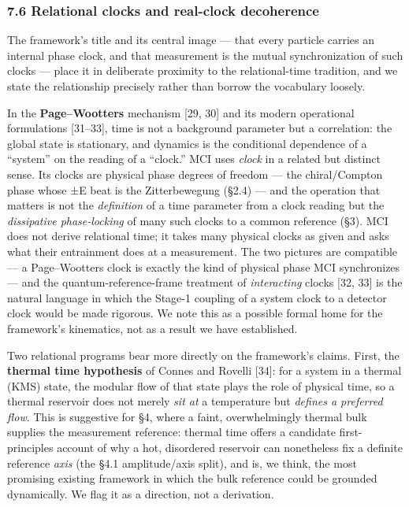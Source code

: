 \documentclass[
]{article}
\newcounter{none} %
\begin{document}
\subsubsection{7.6 Relational clocks and real-clock
decoherence}\label{relational-clocks-and-real-clock-decoherence}

The framework's title and its central image --- that every particle
carries an internal phase clock, and that measurement is the mutual
synchronization of such clocks --- place it in deliberate proximity to
the relational-time tradition, and we state the relationship precisely
rather than borrow the vocabulary loosely.

In the \textbf{Page--Wootters} mechanism {[}29, 30{]} and its modern
operational formulations {[}31--33{]}, time is not a background
parameter but a correlation: the global state is stationary, and
dynamics is the conditional dependence of a ``system'' on the reading of
a ``clock.'' MCI uses \emph{clock} in a related but distinct sense. Its
clocks are physical phase degrees of freedom --- the chiral/Compton
phase whose ±E beat is the Zitterbewegung (§2.4) --- and the operation
that matters is not the \emph{definition} of a time parameter from a
clock reading but the \emph{dissipative phase-locking} of many such
clocks to a common reference (§3). MCI does not derive relational time;
it takes many physical clocks as given and asks what their entrainment
does at a measurement. The two pictures are compatible --- a
Page--Wootters clock is exactly the kind of physical phase MCI
synchronizes --- and the quantum-reference-frame treatment of
\emph{interacting} clocks {[}32, 33{]} is the natural language in which
the Stage-1 coupling of a system clock to a detector clock would be made
rigorous. We note this as a possible formal home for the framework's
kinematics, not as a result we have established.

Two relational programs bear more directly on the framework's claims.
First, the \textbf{thermal time hypothesis} of Connes and Rovelli
{[}34{]}: for a system in a thermal (KMS) state, the modular flow of
that state plays the role of physical time, so a thermal reservoir does
not merely \emph{sit at} a temperature but \emph{defines a preferred
flow}. This is suggestive for §4, where a faint, overwhelmingly thermal
bulk supplies the measurement reference: thermal time offers a candidate
first-principles account of why a hot, disordered reservoir can
nonetheless fix a definite reference \emph{axis} (the §4.1
amplitude/axis split), and is, we think, the most promising existing
framework in which the bulk reference could be grounded dynamically. We
flag it as a direction, not a derivation.
\end{document}
